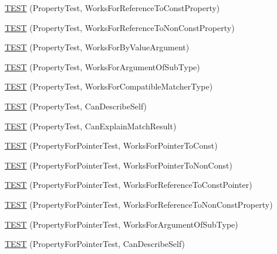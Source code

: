 \begin{DoxyCompactItemize}
\item 
\hyperlink{namespacetesting_1_1gmock__matchers__test_a7254899c6d45df648d5b4ef6eece3ae0}{T\+E\+ST} (Property\+Test, Works\+For\+Reference\+To\+Const\+Property)
\item 
\hyperlink{namespacetesting_1_1gmock__matchers__test_a5b7b02e8fcef1aff9a4afc81d5fb5d5f}{T\+E\+ST} (Property\+Test, Works\+For\+Reference\+To\+Non\+Const\+Property)
\item 
\hyperlink{namespacetesting_1_1gmock__matchers__test_af703b24e2bee13cf7a042f699809a5ab}{T\+E\+ST} (Property\+Test, Works\+For\+By\+Value\+Argument)
\item 
\hyperlink{namespacetesting_1_1gmock__matchers__test_a38a5ad623dda9ef0f48ebaf65485d18e}{T\+E\+ST} (Property\+Test, Works\+For\+Argument\+Of\+Sub\+Type)
\item 
\hyperlink{namespacetesting_1_1gmock__matchers__test_a17b7a59d1dbca0692ebaa71e6f46f1d6}{T\+E\+ST} (Property\+Test, Works\+For\+Compatible\+Matcher\+Type)
\item 
\hyperlink{namespacetesting_1_1gmock__matchers__test_a8c749e210723e33547e58fe8822fb85e}{T\+E\+ST} (Property\+Test, Can\+Describe\+Self)
\item 
\hyperlink{namespacetesting_1_1gmock__matchers__test_aff810d2cdd79c55d483965a28bb5069a}{T\+E\+ST} (Property\+Test, Can\+Explain\+Match\+Result)
\item 
\hyperlink{namespacetesting_1_1gmock__matchers__test_ac9222439b8e0b1e080650d667044c140}{T\+E\+ST} (Property\+For\+Pointer\+Test, Works\+For\+Pointer\+To\+Const)
\item 
\hyperlink{namespacetesting_1_1gmock__matchers__test_acc639f3cbeacf4af712bf02ac451b160}{T\+E\+ST} (Property\+For\+Pointer\+Test, Works\+For\+Pointer\+To\+Non\+Const)
\item 
\hyperlink{namespacetesting_1_1gmock__matchers__test_a028687dfb04ec008ea129f9cc95aac62}{T\+E\+ST} (Property\+For\+Pointer\+Test, Works\+For\+Reference\+To\+Const\+Pointer)
\item 
\hyperlink{namespacetesting_1_1gmock__matchers__test_a78762b60c9d0c985916b698e6d4c55e3}{T\+E\+ST} (Property\+For\+Pointer\+Test, Works\+For\+Reference\+To\+Non\+Const\+Property)
\item 
\hyperlink{namespacetesting_1_1gmock__matchers__test_a4c2f4b483550e2e70b09eea3836b83e0}{T\+E\+ST} (Property\+For\+Pointer\+Test, Works\+For\+Argument\+Of\+Sub\+Type)
\item 
\hyperlink{namespacetesting_1_1gmock__matchers__test_a064fc5dd5ca0106e8ed0fbc483472186}{T\+E\+ST} (Property\+For\+Pointer\+Test, Can\+Describe\+Self)

\end{DoxyCompactItemize}
